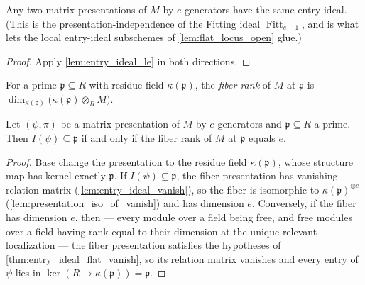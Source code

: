 \begin{theorem}
  \label{thm:entry_ideal_presentation_independent}
  \leanok
  Any two matrix presentations of \(M\) by \(e\) generators have the same
  entry ideal.  (This is the presentation-independence of the Fitting ideal
  \(\operatorname{Fitt}_{e-1}\), and is what lets the local entry-ideal
  subschemes of \cref{lem:flat_locus_open} glue.)
\end{theorem}

\begin{proof}
  \leanok
  Apply \cref{lem:entry_ideal_le} in both directions.
\end{proof}

\begin{definition}
  \label{def:fiber_rank}
  \leanok
  For a prime \(\mathfrak p \subseteq R\) with residue field
  \(\kappa(\mathfrak p)\), the \emph{fiber rank} of \(M\) at
  \(\mathfrak p\) is
  \(\dim_{\kappa(\mathfrak p)} \bigl(\kappa(\mathfrak p) \otimes_R M\bigr)\).
\end{definition}

\begin{theorem}
  \label{thm:entry_ideal_prime_iff}
  \leanok
  Let \((\psi, \pi)\) be a matrix presentation of \(M\) by \(e\) generators
  and \(\mathfrak p \subseteq R\) a prime.  Then
  \(I(\psi) \subseteq \mathfrak p\) if and only if the fiber rank of \(M\)
  at \(\mathfrak p\) equals \(e\).
\end{theorem}

\begin{proof}
  \leanok
  Base change the presentation to the residue field
  \(\kappa(\mathfrak p)\), whose structure map has kernel exactly
  \(\mathfrak p\).  If \(I(\psi) \subseteq \mathfrak p\), the fiber
  presentation has vanishing relation matrix
  (\cref{lem:entry_ideal_vanish}), so the fiber is isomorphic to
  \(\kappa(\mathfrak p)^{\oplus e}\)
  (\cref{lem:presentation_iso_of_vanish}) and has dimension \(e\).
  Conversely, if the fiber has dimension \(e\), then --- every module over
  a field being free, and free modules over a field having rank equal to
  their dimension at the unique relevant localization --- the fiber
  presentation satisfies the hypotheses of
  \cref{thm:entry_ideal_flat_vanish}, so its relation matrix vanishes and
  every entry of \(\psi\) lies in
  \(\ker(R \to \kappa(\mathfrak p)) = \mathfrak p\).
\end{proof}

